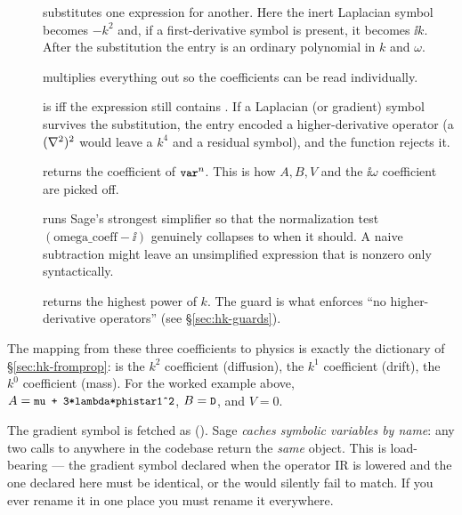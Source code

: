 \begin{description}
  \item[] substitutes one expression for another. Here the
        inert Laplacian symbol becomes $-k^{2}$ and, if a first-derivative symbol
         is present, it becomes $\ii k$. After the substitution
        the entry is an ordinary polynomial in $k$ and $\omega$.
  \item[] multiplies everything out so the coefficients can be
        read individually.
  \item[] is  iff the expression still contains
        . If a Laplacian (or gradient) symbol survives the
        substitution, the entry encoded a higher-derivative operator (a
        $(\nabla^2)^{2}$ would leave a $k^{4}$ and a residual symbol), and the function
        rejects it.
  \item[] returns the coefficient of $\texttt{\small var}^{n}$.
        This is how $A,B,V$ and the $\ii\omega$ coefficient are picked off.
  \item[] runs Sage's strongest simplifier so that the
        normalization test $(\text{omega\_coeff}-\ii)$ genuinely collapses to
         when it should. A naive subtraction might leave an
        unsimplified expression that is nonzero only syntactically.
  \item[] returns the highest power of $k$. The guard
         is what enforces ``no higher-derivative operators'' (see
        \S\ref{sec:hk-guards}).
\end{description}

The mapping from these three coefficients to physics is exactly the dictionary
of \S\ref{sec:hk-fromprop}:  is the $k^{2}$ coefficient (diffusion),
 the $k^{1}$ coefficient (drift),  the $k^{0}$ coefficient
(mass). For the worked example above, $A=\texttt{\small mu + 3*lambda*phistar1\^{}2}$,
$B=\texttt{\small D}$, and $V=0$.

\begin{gotcha}
The gradient symbol is fetched as 
(). Sage \emph{caches symbolic variables by name}: any
two calls to  anywhere in the codebase return the
\emph{same} object. This is load-bearing --- the gradient symbol declared when
the operator IR is lowered and the one declared here must be identical, or the
 would silently fail to match. If you ever rename it in one place
you must rename it everywhere.
\end{gotcha}

